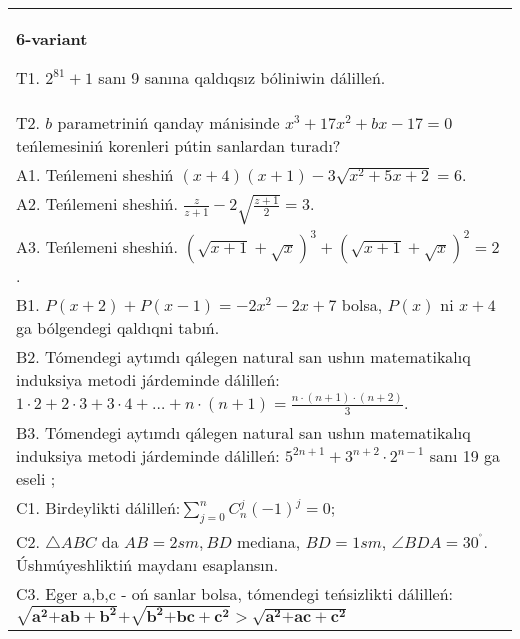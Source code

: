 \documentclass{article}
\begin{document}
\begin{tabular}{m{17cm}}
\textbf{6-variant}
\newline

T1. \(2^{81} + 1\) sanı 9 sanına qaldıqsız bóliniwin dálilleń. \\
T2. \(b\) parametriniń qanday mánisinde \(x^{3} + 17x^{2} + bx - 17 = 0\) teńlemesiniń korenleri pútin sanlardan turadı? \\
A1. Teńlemeni sheshiń \((x + 4)(x + 1) - 3\sqrt{x^{2} + 5x + 2} = 6\). \\
A2. Teńlemeni sheshiń. \(\frac{z}{z + 1} - 2\sqrt{\frac{z + 1}{2}} = 3\). \\
A3. Teńlemeni sheshiń. \((\sqrt{x + 1} + \sqrt{x})^{3} + (\sqrt{x + 1} + \sqrt{x})^{2} = 2\). \\
B1. \(P(x + 2) + P(x - 1) = - 2x^{2} - 2x + 7\) bolsa, \(P(x)\) ni \(x + 4\) ga bólgendegi qaldıqni tabıń. \\
B2. Tómendegi aytımdı qálegen natural san ushın matematikalıq induksiya metodi járdeminde dálilleń: \(1 \cdot 2 + 2 \cdot 3 + 3 \cdot 4 + \ldots + n \cdot (n + 1) = \frac{n \cdot (n + 1) \cdot (n + 2)}{3}\). \\
B3. Tómendegi aytımdı qálegen natural san ushın matematikalıq induksiya metodi járdeminde dálilleń: \(5^{2n + 1} + 3^{n + 2} \cdot 2^{n - 1}\) sanı 19 ga eseli ; \\
C1. Birdeylikti dálilleń:\(\sum_{j = 0}^{n}C_{n}^{j}( - 1)^{j} = 0\); \\
C2. \(\bigtriangleup ABC\) da \(AB = 2sm,BD\) mediana, \(BD = 1sm\), \(\angle BDA = 30^{{^\circ}}\). Úshmúyeshliktiń maydanı esaplansın. \\
C3. Eger a,b,c - oń sanlar bolsa, tómendegi teńsizlikti dálilleń: \(\sqrt{\mathbf{a}^{\mathbf{2}}\mathbf{+ ab +}\mathbf{b}^{\mathbf{2}}}\mathbf{+}\sqrt{\mathbf{b}^{\mathbf{2}}\mathbf{+ bc +}\mathbf{c}^{\mathbf{2}}}\mathbf{>}\sqrt{\mathbf{a}^{\mathbf{2}}\mathbf{+ ac +}\mathbf{c}^{\mathbf{2}}}\) \\

\end{tabular}
\vspace{1cm}
\end{document}
